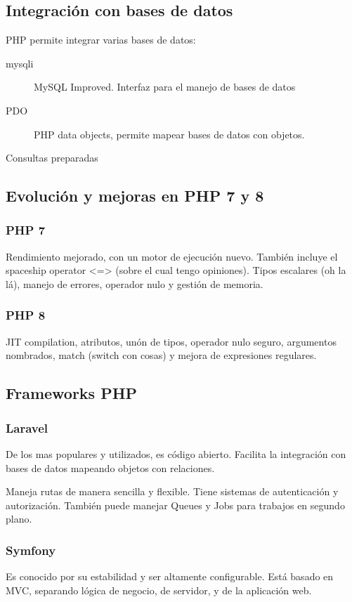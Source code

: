 \subsection{Integración con bases de datos}
    PHP permite integrar varias bases de datos:
    \begin{description}
        \item[mysqli] MySQL Improved. Interfaz para el manejo de bases de datos
        \item[PDO] PHP data objects, permite mapear bases de datos con objetos.
        \item[Consultas preparadas]
    \end{description}

\subsection{Evolución y mejoras en PHP 7 y 8}
    \subsubsection{PHP 7}
        Rendimiento mejorado, con un motor de ejecución nuevo. También incluye el spaceship operator <=> (sobre el cual tengo opiniones). Tipos escalares (oh la lá), manejo de errores, operador  nulo y gestión de memoria.
    \subsubsection{PHP 8}
        JIT compilation, atributos, unón de tipos, operador nulo seguro, argumentos nombrados, match (switch con cosas) y mejora de expresiones regulares.

\subsection{Frameworks PHP}
    \subsubsection{Laravel}
        De los mas populares y utilizados, es código abierto. Facilita la integración con bases de datos mapeando objetos con relaciones.

        Maneja rutas de manera sencilla y flexible. Tiene sistemas de autenticación y autorización. También puede manejar Queues y Jobs para trabajos en segundo plano.


    \subsubsection{Symfony}
        Es conocido por su estabilidad y ser altamente configurable. Está basado en MVC, separando lógica de negocio, de servidor, y de la aplicación web.
